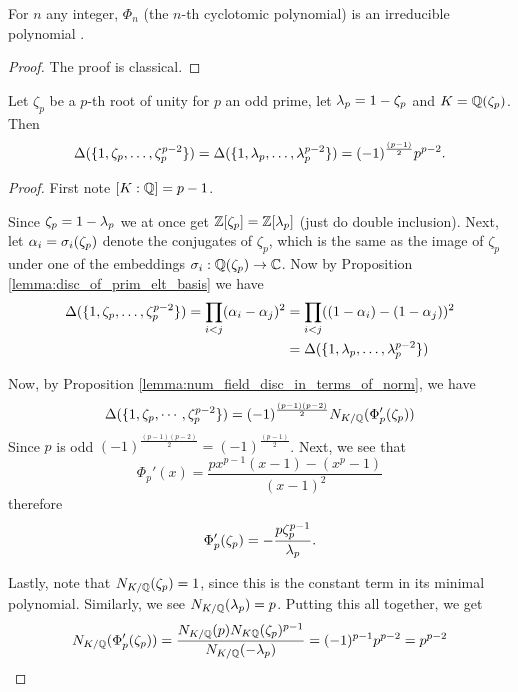 \begin{lemma}\label{lemma:cyclo_poly_irr}
    \leanok
	For $n$ any integer, $\Phi_n$ (the $n$-th cyclotomic polynomial) is an irreducible polynomial .
\end{lemma}
\begin{proof}
    \leanok
The proof is classical.
\end{proof}

\begin{lemma}\label{lem:discr_of_cyclo}
	\leanok 
	Let $\zeta_p$ be a $p$-th root of unity for $p$ an odd prime, let $\lambda_p=1-\zeta_p$ and $K=\mathbb{Q}(\zeta_p)$. Then \[\Delta(\{1,\zeta_p,\dots,\zeta_p^{p-2}\})=\Delta(\{1,\lambda_p,\dots,\lambda_p^{p-2}\})=(-1)^{\frac{(p-1)}{2}}p^{p-2}.\]
\end{lemma}
\begin{proof}
    \leanok
	First note $[K:\mathbb{Q}]=p-1$.

	Since $\zeta_p=1-\lambda_p$ we at once get $\mathbb{Z}[\zeta_p]=\mathbb{Z}[\lambda_p]$ (just do double inclusion). Next, let $\alpha_i=\sigma_i(\zeta_p)$ denote the conjugates of $\zeta_p$, which is the same as the image of $\zeta_p$ under one of the embeddings $\sigma_i: \mathbb{Q}(\zeta_p) \to \mathbb{C}$. Now  by Proposition \ref{lemma:disc_of_prim_elt_basis} we have \begin{align*}\Delta(\{1,\zeta_p,\dots,\zeta_p^{p-2}\})=\prod_{i < j}  (\alpha_i-\alpha_j)^2 &=\prod_{i < j}  ((1-\alpha_i)-(1-\alpha_j))^2\\&=\Delta(\{1,\lambda_p,\dots,\lambda_p^{p-2}\})\end{align*}

	Now, by Proposition \ref{lemma:num_field_disc_in_terms_of_norm}, we have \[\Delta(\{1,\zeta_p,\cdots,\zeta_p^{p-2}\})=(-1)^{\frac{(p-1)(p-2)}{2}}N_{K/\mathbb{Q}}(\Phi_p'(\zeta_p)  )\]
	Since $p$ is odd $(-1)^{\frac{(p-1)(p-2)}{2}}=(-1)^{\frac{(p-1)}{2}}$. Next, we see that \[\Phi_p'(x)=\frac{px^{p-1}(x-1)-(x^p-1)}{(x-1)^2}\] therefore \[\Phi_p'(\zeta_p)=-\frac{p\zeta_p^{p-1}}{\lambda_p}.\]

	Lastly, note that $N_{K/\mathbb{Q}}(\zeta_p)=1$, since this is the constant term in its minimal polynomial. Similarly, we see $N_{K/\mathbb{Q}}(\lambda_p)=p$. Putting this all together, we get \[N_{K/\mathbb{Q}}(\Phi_p'(\zeta_p)  )=\frac{N_{K/\mathbb{Q}}(p)N_{K\mathbb{Q}}(\zeta_p)^{p-1}}{N_{K/\mathbb{Q}}(-\lambda_p)}=(-1)^{p-1}p^{p-2}=p^{p-2}\]
\end{proof}

